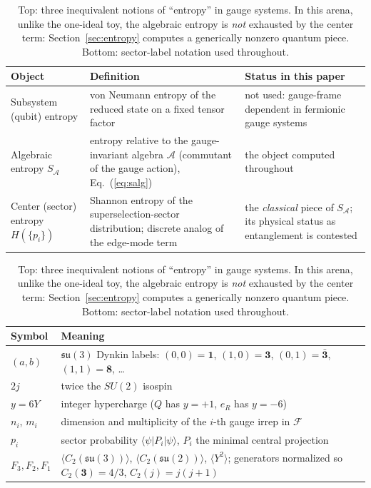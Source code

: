\documentclass[11pt]{article}
\newcommand{\Alg}{\mathcal{A}}
\newcommand{\SA}{S_{\mathcal{A}}}
\newcommand{\Fock}{\mathcal{F}}
\newcommand{\su}[1]{\mathfrak{su}(#1)}
\begin{document}
\begin{table}[ht]
\centering
\small
\begin{tabular}{p{}p{}p{}}
\toprule
\textbf{Object} & \textbf{Definition} & \textbf{Status in this paper} \\
\midrule
Subsystem (qubit) entropy & von Neumann entropy of the reduced state on a fixed tensor factor & not used: gauge-frame dependent in fermionic gauge systems \cite{p1} \\[3pt]
Algebraic entropy $\SA$ & entropy relative to the gauge-invariant algebra $\Alg$ (commutant of the gauge action), Eq.~(\ref{eq:salg}) \cite{barnum,zanardi,chr} & the object computed throughout \\[3pt]
Center (sector) entropy $H(\{p_i\})$ & Shannon entropy of the superselection-sector distribution; discrete analog of the edge-mode term \cite{donnelly12,donnelly14} & the \emph{classical} piece of $\SA$; its physical status as entanglement is contested \cite{chmp,soni} \\
\bottomrule
\end{tabular}

\medskip

\begin{tabular}{ll}
\toprule
\textbf{Symbol} & \textbf{Meaning} \\
\midrule
$(a,b)$ & $\su3$ Dynkin labels: $(0,0)=\mathbf{1}$, $(1,0)=\mathbf{3}$, $(0,1)=\bar{\mathbf{3}}$, $(1,1)=\mathbf{8}$, \ldots \\
$2j$ & twice the $SU(2)$ isospin \\
$y = 6Y$ & integer hypercharge ($Q$ has $y=+1$, $e_R$ has $y=-6$) \\
$n_i$, $m_i$ & dimension and multiplicity of the $i$-th gauge irrep in $\Fock$ \\
$p_i$ & sector probability $\langle\psi|P_i|\psi\rangle$, $P_i$ the minimal central projection \\
$F_3, F_2, F_1$ & $\langle C_2(\su3)\rangle$, $\langle C_2(\su2)\rangle$, $\langle Y^2\rangle$; generators normalized so $C_2(\mathbf{3})=4/3$, $C_2(j)=j(j+1)$ \\
\bottomrule
\end{tabular}
\caption{Top: three inequivalent notions of ``entropy'' in gauge systems. In this arena, unlike the one-ideal toy, the algebraic entropy is \emph{not} exhausted by the center term: Section~\ref{sec:entropy} computes a generically nonzero quantum piece. Bottom: sector-label notation used throughout.}
\label{tab:notation}
\end{table}
\end{document}
